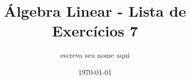 \documentclass[leqno]{article}
\begin{document}
\newtheorem{teo}{Teorema} \newtheorem*{teo*}{Teorema}
\newtheorem{prop}[teo]{Proposição} \newtheorem*{prop*}{Proposição}
\newtheorem{lema}[teo]{Lemma} \newtheorem*{lema*}{Lema}
\newtheorem{cor}[teo]{Corolário} \newtheorem*{cor*}{Corolário}

\theoremstyle{definition}
\newtheorem{defi}[teo]{Definição} \newtheorem*{defi*}{Definição}
\newtheorem{exem}[teo]{Exemplo} \newtheorem*{exem*}{Exemplo}
\newtheorem{obs}[teo]{Observação} \newtheorem*{obs*}{Observação}
\newtheorem*{hipo}{Hipóteses}
\newtheorem*{nota}{Notação}

\newcommand{\ds}{\displaystyle} \newcommand{\nl}{\newline}
\newcommand{\eps}{\varepsilon} \newcommand{\ssty}{\scriptstyle}
\newcommand{\bE}{\mathbb{E}}
\newcommand{\cB}{\mathcal{B}}
\newcommand{\cF}{\mathcal{F}}
\newcommand{\cA}{\mathcal{A}}
\newcommand{\cM}{\mathcal{M}}
\newcommand{\cD}{\mathcal{D}}
\newcommand{\cN}{\mathcal{N}}
\newcommand{\cL}{\mathcal{L}}
\newcommand{\cLN}{\mathcal{LN}}
\newcommand{\bP}{\mathbb{P}}
\newcommand{\bQ}{\mathbb{Q}}
\newcommand{\bN}{\mathbb{N}}
\newcommand{\bR}{\mathbb{R}}
\newcommand{\bZ}{\mathbb{Z}}

\newcommand{\bfw}{\mathbf{w}}
\newcommand{\bfv}{\mathbf{v}}
\newcommand{\bfu}{\mathbf{u}}
\newcommand{\bfx}{\mathbf{x}}
\newcommand{\bfb}{\mathbf{b}}

\newcommand{\bvecc}[2]{%
  \begin{bmatrix} #1 \\ #2  \end{bmatrix}
}
\newcommand{\bveccc}[3]{%
  \begin{bmatrix} #1 \\ #2 \\ #3  \end{bmatrix}
}

\newenvironment{sol} 
{
    \vspace{4mm}
    \noindent\textbf{Resolução:}
    \strut\newline
    \smallskip
    \hspace{-3.5mm} 
} 
{\noindent\rule{4cm}{.1mm}}

\title{Álgebra Linear - Lista de Exercícios 7}

\author{escreva seu nome aqui}

\date{\today}

\maketitle
\end{document}
